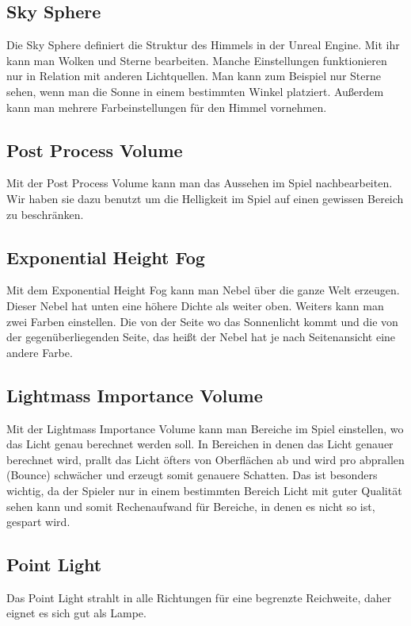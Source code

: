 \subsection{Sky Sphere}
Die Sky Sphere definiert die Struktur des Himmels in der Unreal Engine.
Mit ihr kann man Wolken und Sterne bearbeiten. Manche Einstellungen funktionieren nur in Relation mit anderen
Lichtquellen. Man kann zum Beispiel nur Sterne sehen, wenn man die Sonne in einem bestimmten Winkel platziert.
Außerdem kann man mehrere Farbeinstellungen für den Himmel vornehmen.

\subsection{Post Process Volume}
Mit der Post Process Volume kann man das Aussehen im Spiel nachbearbeiten. \citep{unreal:postProcessVolume}
Wir haben sie dazu benutzt um die Helligkeit im Spiel auf einen gewissen Bereich zu beschränken.

\subsection{Exponential Height Fog}
Mit dem Exponential Height Fog kann man Nebel über die ganze Welt erzeugen. Dieser Nebel hat unten eine höhere Dichte als weiter oben. Weiters kann man zwei Farben einstellen.
Die von der Seite wo das Sonnenlicht kommt und die von der gegenüberliegenden Seite, das heißt der Nebel hat je nach Seitenansicht eine andere Farbe. \citep{unreal:exponentialHeightFog}

\subsection{Lightmass Importance Volume}
Mit der Lightmass Importance Volume kann man Bereiche im Spiel einstellen, wo das Licht genau berechnet werden soll. In Bereichen in denen das
Licht genauer berechnet wird, prallt das Licht öfters von Oberflächen ab und wird pro abprallen (Bounce) schwächer und erzeugt somit genauere Schatten.
Das ist besonders wichtig, da der Spieler nur in einem bestimmten Bereich Licht mit guter Qualität sehen kann und somit Rechenaufwand für Bereiche,
in denen es nicht so ist, gespart wird. \citep{unreal:lightmassImportanceVolume}

\subsection{Point Light}
Das Point Light strahlt in alle Richtungen für eine begrenzte Reichweite, daher eignet es sich gut als Lampe.

